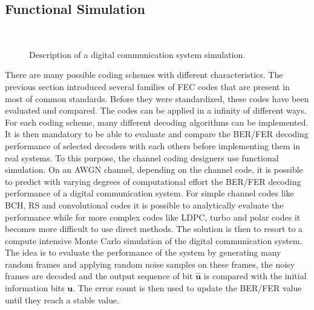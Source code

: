 \subsection{Functional Simulation}
\label{sec:ctx_simulation}

\begin{figure}[htp]
  \centering
  \\
  \caption{Description of a digital communication system simulation.}
  \label{fig:ctx_simu_com_chain}
\end{figure}

There are many possible coding schemes with different characteristics. The
previous section introduced several families of FEC codes that are present in
most of common standards. Before they were standardized, these codes have been
evaluated and compared. The codes can be applied in a infinity of different
ways. For each coding scheme, many different decoding algorithms can be
implemented. It is then mandatory to be able to evaluate and compare the BER/FER
decoding performance of selected decoders with each others before implementing
them in real systems. To this purpose, the channel coding designers use
functional simulation. On an AWGN channel, depending on the channel code, it is
possible to predict with varying degrees of computational effort the BER/FER
decoding performance of a digital communication system. For simple channel codes
like BCH, RS and convolutional codes it is possible to analytically evaluate the
performance while for more complex codes like LDPC, turbo and polar codes it
becomes more difficult to use direct methods. The solution is then to resort to
a compute intensive Monte Carlo simulation of the digital communication system.
The idea is to evaluate the performance of the system by generating many random
frames and applying random noise samples on these frames, the noisy frames are
decoded and the output sequence of bit $\bm{\hat{u}}$ is compared with the
initial information bits $\bm{u}$. The error count is then used to update the
BER/FER value until they reach a stable value.

